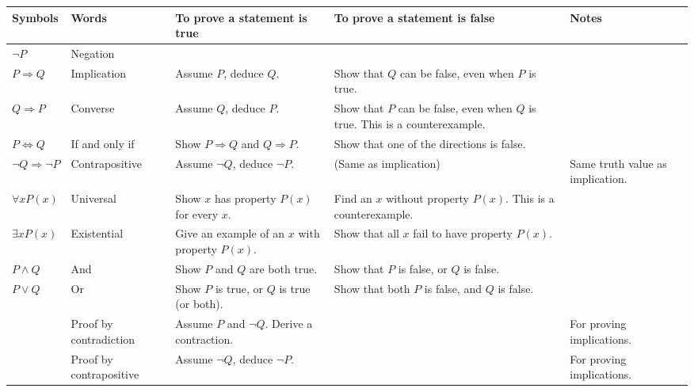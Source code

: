 \documentclass[11pt]{article}
\theoremstyle{definition}
\numberwithin{thm}{section}
\begin{document}
\begin{table}[!ht]\label{table:logic}
\begin{tabular}{p{2cm}|p{2.5cm}|p{3cm}|p{3cm}|p{2.2cm}}
\textbf{Symbols}            & \textbf{Words}          & \textbf{To prove a statement is true}           & \textbf{To prove a statement is false}             & \textbf{Notes}                   \\\hline
$\neg P$                    & Negation                &                                                 &                                                    &                                  \\\hline
$P \Rightarrow Q$           & Implication             & Assume $P$, deduce $Q$.                         & Show that $Q$ can be false, even when $P$ is true. &                                  \\\hline
$Q \Rightarrow P$           & Converse                & Assume $Q$, deduce $P$.                         & Show that $P$ can be false, even when $Q$ is true. This is a counterexample. &                                  \\\hline
$P \Leftrightarrow Q$       & If and only if          & Show $P \Rightarrow Q$ and $Q \Rightarrow P$.   & Show that one of the directions is false.          &                                  \\\hline
$\neg Q \Rightarrow \neg P$ & Contrapositive          & Assume $\neg Q$, deduce $\neg P$.               & (Same as implication)                              & Same truth value as implication. \\\hline
$\forall x P(x)$            & Universal               & Show $x$ has property $P(x)$ for every $x$.     & Find an $x$ without property $P(x)$. This is a counterexample.               &                                  \\\hline
$\exists x P(x)$            & Existential             & Give an example of an $x$ with property $P(x)$. & Show that all $x$ fail to have property $P(x)$.    &                                  \\\hline
$P \wedge Q$                  & And                     & Show $P$ and $Q$ are both true.                 & Show that $P$ is false, or $Q$ is false.           &                                  \\\hline
$P \vee Q$                  & Or                      & Show $P$ is true, or $Q$ is true (or both).     & Show that both $P$ is false, and $Q$ is false.     &                                  \\\hline
                            & Proof by contradiction  & Assume $P$ and $\neg Q$. Derive a contraction.  &                                                    & For proving implications.        \\\hline
                            & Proof by contrapositive & Assume $\neg Q$, deduce $\neg P$.               &                                                    & For proving implications.       
\end{tabular}
\end{table}
\end{document}
